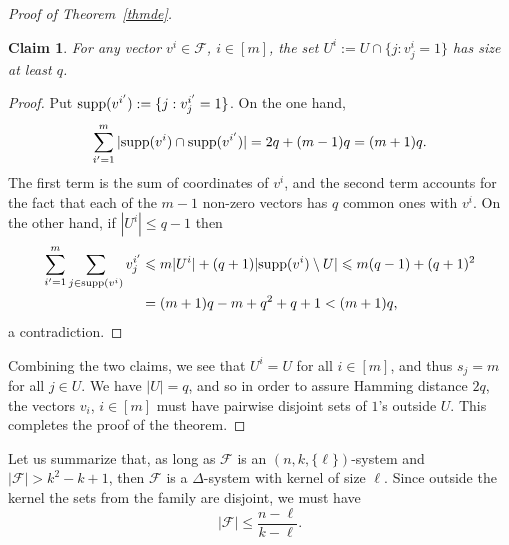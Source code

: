 \documentclass[graybox]{svmult}
\renewcommand{\le}{\leqslant}
\newcommand{\ff}{\mathcal{F}}
\newtheorem{cla}[thm]{Claim}
\begin{document}
\begin{proof}[Proof of Theorem~\ref{thmde}]
\begin{cla}For any vector $v^i\in \mathcal F$, $i\in[m]$, the set $U^i:=U\cap\{j: v_j^i=1\}$ has size at least $q$. \end{cla}
\begin{proof}
Put ${\rm supp}(v^{i'}):=\{j: v_j^{i'}=1\}$.  On the one hand, $$\sum_{i'=1}^m|{\rm supp}(v^{i})\cap {\rm supp}(v^{i'})|=2q+(m-1)q=(m+1)q.$$  The first term is the sum of coordinates of $v^i$, and the second term accounts for the fact that each of the $m-1$ non-zero vectors has $q$ common ones with $v^i$. On the other hand, if $|U^i|\le q-1$ then \begin{align*}\sum_{i'=1}^m\sum_{j\in {\rm supp}(v^i)} v^{i'}_j&\le m|U^i|+(q+1)|{\rm supp}(v^i)\setminus U| \le m(q-1)+(q+1)^2\\ &= (m+1)q-m +q^2+q+1<(m+1)q,\end{align*}
a contradiction. %
\end{proof}
Combining the two claims, we see that $U^i = U$ for all $i\in[m]$, and thus $s_j=m$ for all $j\in U$. We have $|U|=q$, and so in order to assure Hamming distance $2q$, the vectors $v_i$, $i\in[m]$ must have pairwise disjoint sets of $1$'s outside $U$. This completes the proof of the theorem.
\end{proof}
Let us summarize that, as long as $\ff$ is an $(n,k,\{\ell\})$-system and $|\ff|>k^2-k+1$, then $\ff$ is a $\Delta$-system with kernel of size $\ell$. Since outside the kernel the sets from the family are disjoint, we must have
$$|\ff|\le \frac{n-\ell}{k-\ell}.$$
\end{document}

